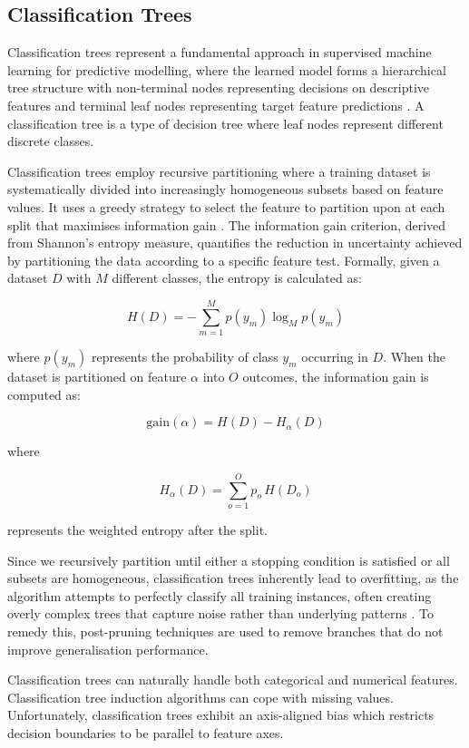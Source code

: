 \documentclass[conference]{IEEEtran}
\begin{document}
\subsection{Classification Trees}
Classification trees represent a fundamental approach in supervised machine learning for predictive modelling, where the learned model forms a hierarchical tree structure with non-terminal nodes representing decisions on descriptive features and terminal leaf nodes representing target feature predictions \cite{quinlan1993c45}. A classification tree is a type of decision tree where leaf nodes represent different discrete classes.

Classification trees employ recursive partitioning where a training dataset is systematically divided into increasingly homogeneous subsets based on feature values. It uses a greedy strategy to select the feature to partition upon at each split that maximises information gain \cite{kelleher2020fundamentals}. The information gain criterion, derived from Shannon's entropy measure, quantifies the reduction in uncertainty achieved by partitioning the data according to a specific feature test.
Formally, given a dataset $D$ with $M$ different classes, the entropy is calculated as:

\[
H(D) = -\sum_{m=1}^{M} p(y_m) \log_{M} p(y_m)
\]

where $p(y_m)$ represents the probability of class $y_m$ occurring in $D$. When the dataset is partitioned on feature $\alpha$ into $O$ outcomes, the information gain is computed as:

\[
\text{gain}(\alpha) = H(D) - H_\alpha(D)
\]

where 

\[
H_\alpha(D) = \sum_{o=1}^{O} p_o \, H(D_o)
\]

represents the weighted entropy after the split.

Since we recursively partition until either a stopping condition is satisfied or all subsets are homogeneous, classification trees inherently lead to overfitting, as the algorithm attempts to perfectly classify all training instances, often creating overly complex trees that capture noise rather than underlying patterns \cite{quinlan1993c45}. To remedy this, post-pruning techniques are used to remove branches that do not improve generalisation performance.

Classification trees can naturally handle both categorical and numerical features. Classification tree induction algorithms can cope with missing values. Unfortunately, classification trees exhibit an axis-aligned bias which restricts decision boundaries to be parallel to feature axes.
\end{document}
